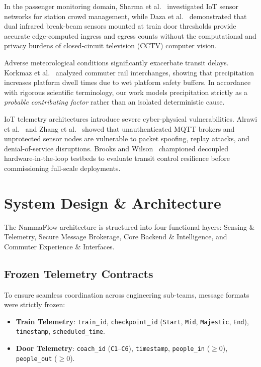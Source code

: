 \documentclass[conference]{IEEEtran}
\begin{document}
In the passenger monitoring domain, Sharma et al.~\cite{sharma2019smart} investigated IoT sensor networks for station crowd management, while Daza et al.~\cite{daza2020edge} demonstrated that dual infrared break-beam sensors mounted at train door thresholds provide accurate edge-computed ingress and egress counts without the computational and privacy burdens of closed-circuit television (CCTV) computer vision.

Adverse meteorological conditions significantly exacerbate transit delays. Korkmaz et al.~\cite{korkmaz2021delay} analyzed commuter rail interchanges, showing that precipitation increases platform dwell times due to wet platform safety buffers. In accordance with rigorous scientific terminology, our work models precipitation strictly as a \textit{probable contributing factor} rather than an isolated deterministic cause.

IoT telemetry architectures introduce severe cyber-physical vulnerabilities. Alrawi et al.~\cite{alrawi2022cyber} and Zhang et al.~\cite{zhang2022resilient} showed that unauthenticated MQTT brokers and unprotected sensor nodes are vulnerable to packet spoofing, replay attacks, and denial-of-service disruptions. Brooks and Wilson~\cite{brooks2019evaluating} championed decoupled hardware-in-the-loop testbeds to evaluate transit control resilience before commissioning full-scale deployments.

\section{System Design \& Architecture}
The NammaFlow architecture is structured into four functional layers: Sensing \& Telemetry, Secure Message Brokerage, Core Backend \& Intelligence, and Commuter Experience \& Interfaces.

\subsection{Frozen Telemetry Contracts}
To ensure seamless coordination across engineering sub-teams, message formats were strictly frozen:
\begin{itemize}
    \item \textbf{Train Telemetry}: \texttt{train\_id}, \texttt{checkpoint\_id} (\texttt{Start}, \texttt{Mid}, \texttt{Majestic}, \texttt{End}), \texttt{timestamp}, \texttt{scheduled\_time}.
    \item \textbf{Door Telemetry}: \texttt{coach\_id} (\texttt{C1}--\texttt{C6}), \texttt{timestamp}, \texttt{people\_in} ($\ge 0$), \texttt{people\_out} ($\ge 0$).
\end{itemize}
\end{document}

